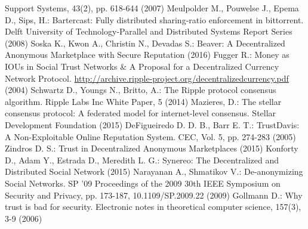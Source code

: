 \begin{thebibliography}{40}
  Support Systems, 43(2), pp. 618-644 (2007)
  Meulpolder M., Pouwelse J., Epema D., Sips, H.: Bartercast: Fully distributed sharing-ratio enforcement in bittorrent.
  Delft University of Technology-Parallel and Distributed Systems Report Series (2008)
  Soska K., Kwon A., Christin N., Devadas S.: Beaver: A Decentralized Anonymous Marketplace with Secure Reputation (2016)
  Fugger R.: Money as IOUs in Social Trust Networks \& A Proposal for a Decentralized Currency Network Protocol.
  \url{http://archive.ripple-project.org/decentralizedcurrency.pdf} (2004)
  Schwartz D., Youngs N., Britto, A.: The Ripple protocol consensus algorithm. Ripple Labs Inc White Paper, 5 (2014)
  Mazieres, D.: The stellar consensus protocol: A federated model for internet-level consensus. Stellar Development
  Foundation (2015)
  DeFigueiredo D. D. B., Barr E. T.: TrustDavis: A Non-Exploitable Online Reputation System. CEC, Vol. 5, pp. 274-283
  (2005)
  Zindros D. S.: Trust in Decentralized Anonymous Marketplaces (2015)
  Konforty D., Adam Y., Estrada D., Meredith L. G.: Synereo: The Decentralized and Distributed Social Network (2015)
  Narayanan A., Shmatikov V.: De-anonymizing Social Networks. SP '09 Proceedings of the 2009 30th IEEE Symposium on
  Security and Privacy, pp. 173-187, 10.1109/SP.2009.22 (2009)
  Gollmann D.: Why trust is bad for security. Electronic notes in theoretical computer science, 157(3), 3-9 (2006)
\end{thebibliography}

